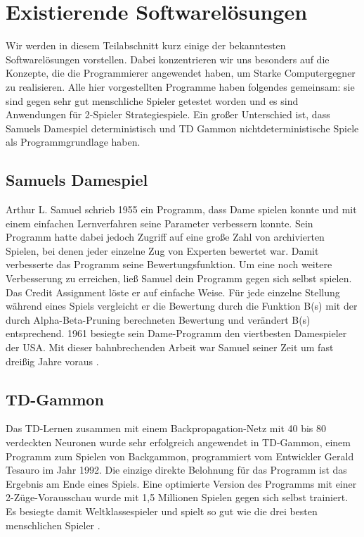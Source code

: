 \section{Existierende Softwarelösungen}
Wir werden in diesem Teilabschnitt kurz einige der bekanntesten Softwarelösungen vorstellen. Dabei konzentrieren wir uns besonders auf die Konzepte, die die Programmierer angewendet haben, um Starke Computergegner zu realisieren. Alle hier vorgestellten Programme haben folgendes gemeinsam: sie sind gegen sehr gut menschliche Spieler getestet worden und es sind Anwendungen für 2-Spieler Strategiespiele. Ein großer Unterschied ist, dass Samuels Damespiel deterministisch und TD Gammon nichtdeterministische Spiele als Programmgrundlage haben.

\subsection{Samuels Damespiel}
Arthur L. Samuel schrieb 1955 ein Programm, dass Dame spielen konnte und mit einem einfachen Lernverfahren seine Parameter verbessern konnte. Sein Programm hatte dabei jedoch Zugriff auf eine große Zahl von archivierten Spielen, bei denen jeder einzelne Zug von Experten bewertet war. Damit verbesserte das Programm seine Bewertungsfunktion. Um eine noch weitere Verbesserung zu erreichen, ließ Samuel dein Programm gegen sich selbst spielen. Das Credit Assignment löste er auf einfache Weise. Für jede einzelne Stellung während eines Spiels vergleicht er die Bewertung durch die Funktion B(s) mit der durch Alpha-Beta-Pruning berechneten Bewertung und verändert B(s) entsprechend. 1961 besiegte sein Dame-Programm den viertbesten Damespieler der USA. Mit dieser bahnbrechenden Arbeit war Samuel seiner Zeit um fast dreißig Jahre voraus \cite[120\psq]{Ertel}.

\subsection{TD-Gammon}
Das TD-Lernen zusammen mit einem Backpropagation-Netz mit 40 bis 80 verdeckten Neuronen wurde sehr erfolgreich angewendet in TD-Gammon, einem Programm zum Spielen von Backgammon, programmiert vom Entwickler Gerald Tesauro im Jahr 1992. Die einzige direkte Belohnung für das Programm ist das Ergebnis am Ende eines Spiels. Eine optimierte Version des Programms mit einer 2-Züge-Vorausschau wurde mit 1,5 Millionen Spielen gegen sich selbst trainiert. Es besiegte damit Weltklassespieler und spielt so gut wie die drei besten menschlichen Spieler \cite[304]{Ertel}.  

